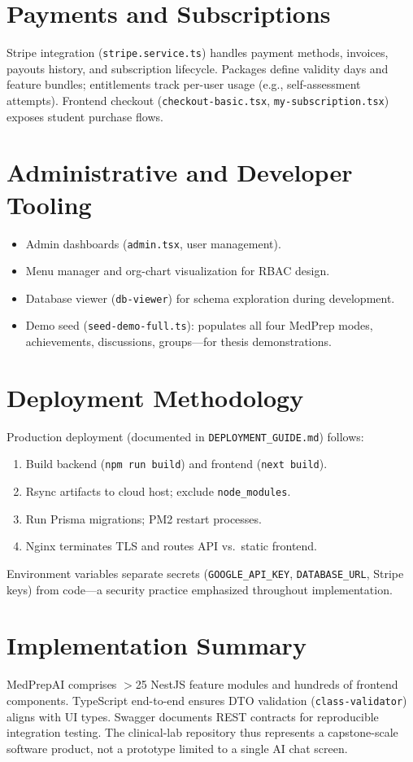 \section{Payments and Subscriptions}
Stripe integration (\texttt{stripe.service.ts}) handles payment methods, invoices, payouts history, and subscription lifecycle. Packages define validity days and feature bundles; entitlements track per-user usage (e.g., self-assessment attempts). Frontend checkout (\texttt{checkout-basic.tsx}, \texttt{my-subscription.tsx}) exposes student purchase flows.

\section{Administrative and Developer Tooling}
\begin{itemize}
  \item Admin dashboards (\texttt{admin.tsx}, user management).
  \item Menu manager and org-chart visualization for RBAC design.
  \item Database viewer (\texttt{db-viewer}) for schema exploration during development.
  \item Demo seed (\texttt{seed-demo-full.ts}): populates all four MedPrep modes, achievements, discussions, groups---for thesis demonstrations.
\end{itemize}

\section{Deployment Methodology}
Production deployment (documented in \texttt{DEPLOYMENT\_GUIDE.md}) follows:
\begin{enumerate}
  \item Build backend (\texttt{npm run build}) and frontend (\texttt{next build}).
  \item Rsync artifacts to cloud host; exclude \texttt{node\_modules}.
  \item Run Prisma migrations; PM2 restart processes.
  \item Nginx terminates TLS and routes API vs.\ static frontend.
\end{enumerate}
Environment variables separate secrets (\texttt{GOOGLE\_API\_KEY}, \texttt{DATABASE\_URL}, Stripe keys) from code---a security practice emphasized throughout implementation.



\section{Implementation Summary}
MedPrepAI comprises $>$25 NestJS feature modules and hundreds of frontend components. TypeScript end-to-end ensures DTO validation (\texttt{class-validator}) aligns with UI types. Swagger documents REST contracts for reproducible integration testing. The clinical-lab repository thus represents a capstone-scale software product, not a prototype limited to a single AI chat screen.
